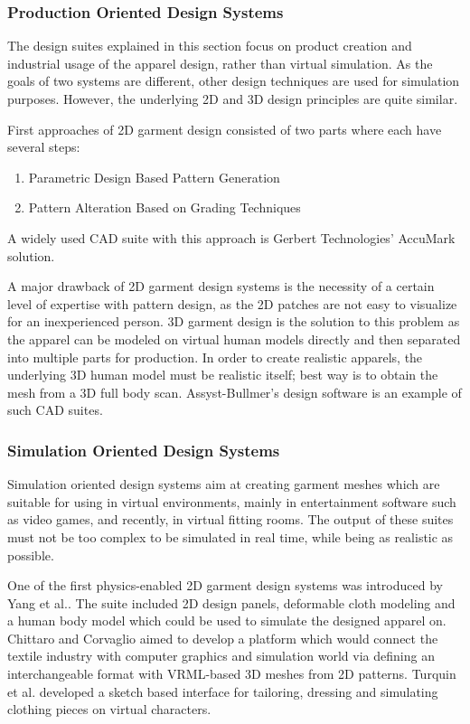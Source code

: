 \subsubsection{Production Oriented Design Systems}

  The design suites explained in this section focus on product creation and industrial usage of the apparel design, rather than virtual simulation. 
  As the goals of two systems are different, other design techniques are used for simulation purposes. However, the underlying 2D and 3D design principles 
  are quite similar.
  
  First approaches of 2D garment design consisted of two parts where each have several steps\cite{Yang2007}:  
 
 \begin{enumerate}
\item Parametric Design Based Pattern Generation
\item Pattern Alteration Based on Grading Techniques
\end{enumerate}    
 
 A widely used CAD suite with this approach is Gerbert Technologies' AccuMark solution\cite{Gerbert2013}. 
 
 A major drawback of 2D garment design systems is the necessity of a certain level of expertise with pattern design, as the 2D patches are not easy to visualize 
 for an inexperienced person. 3D garment design is the solution to this problem as the apparel can be modeled on virtual human models directly and then separated 
 into multiple parts for production. In order to create realistic apparels, the underlying 3D human model must be realistic itself; best way is to obtain the mesh 
 from a 3D full body scan. Assyst-Bullmer's design software is an example of such CAD suites\cite{Assyst2013}. 
 
\subsubsection{Simulation Oriented Design Systems} 
 
 Simulation oriented design systems aim at creating garment meshes which are suitable for using in virtual environments, mainly in entertainment software such 
 as video games, and recently, in virtual fitting rooms. The output of these suites must not be too complex to be simulated in real time, while being as realistic
 as possible.
 
 One of the first physics-enabled 2D garment design systems was introduced by Yang et al.\cite{Yang1992}. The suite included 2D design panels, deformable cloth modeling and
 a human body model which could be used to simulate the designed apparel on. Chittaro and Corvaglio\cite{Chittaro2003} aimed to develop a platform which would connect
 the textile industry with computer graphics and simulation world via defining an interchangeable format with VRML-based 3D meshes from 2D patterns. 
 Turquin et al. developed a sketch based interface for tailoring, dressing and simulating clothing pieces on virtual characters\cite{Turquin2007}.
 
